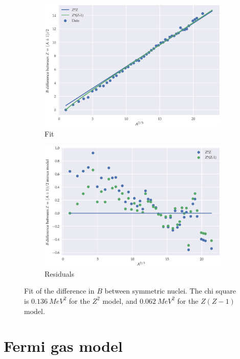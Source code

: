 \documentclass[main.tex]{subfiles}
\begin{document}
\begin{figure}[H]
    \centering
    \begin{subfigure}{0.5\textwidth}
        \includegraphics[width=\textwidth]{figures/odd_A_fit.eps}
        \caption{Fit}
    \end{subfigure}%
    \begin{subfigure}{0.5\textwidth}
        \includegraphics[width=\textwidth]{figures/odd_A_residuals.eps}
        \caption{Residuals}
    \end{subfigure}%
    \caption{Fit of the difference in \(B\) between symmetric nuclei. The chi square is \(\SI{0.136}{MeV^2} \) for the \(Z^2\) model, and \(\SI{0.062}{MeV^2}\) for the \(Z(Z-1)\) model.}
    \label{fig:odd-A-fit}
\end{figure}

\section{Fermi gas model}
\end{document}
